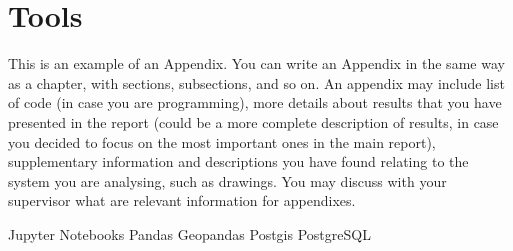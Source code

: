 \chapter{Tools}
\label{chp:appendixb}
\begin{info}
	This is an example of an Appendix. You can write an Appendix in the same way as a chapter, with sections, subsections, and so on. An appendix may include list of code (in case you are programming), more details about results that you have presented in the report (could be a more complete  description of results, in case you decided to focus on the most important ones in the main report), supplementary information and descriptions you have found relating to the system you are analysing, such as drawings. You may discuss with your supervisor what are relevant information for appendixes.
\end{info}
Jupyter Notebooks
Pandas
Geopandas
Postgis
PostgreSQL



